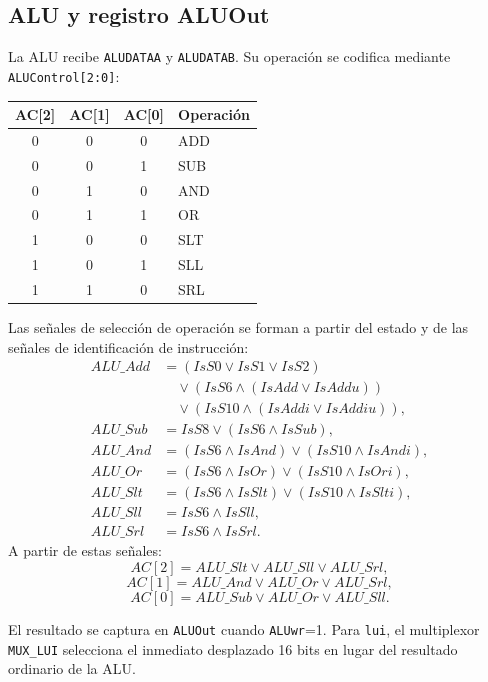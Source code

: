 \documentclass[11pt,a4paper]{article}
\begin{document}
\subsection{ALU y registro ALUOut}

La ALU recibe \texttt{ALUDATAA} y \texttt{ALUDATAB}. Su operación se codifica mediante \texttt{ALUControl[2:0]}:

\begin{center}
\begin{tabular}{ccc l}
\toprule
\textbf{AC[2]} & \textbf{AC[1]} & \textbf{AC[0]} & \textbf{Operación} \\
\midrule
0 & 0 & 0 & ADD \\
0 & 0 & 1 & SUB \\
0 & 1 & 0 & AND \\
0 & 1 & 1 & OR \\
1 & 0 & 0 & SLT \\
1 & 0 & 1 & SLL \\
1 & 1 & 0 & SRL \\
\bottomrule
\end{tabular}
\end{center}

Las señales de selección de operación se forman a partir del estado y de las señales de identificación de instrucción:
\begin{align*}
ALU\_Add &= (IsS0\lor IsS1\lor IsS2)\\
 &\quad\lor(IsS6\land(IsAdd\lor IsAddu))\\
 &\quad\lor(IsS10\land(IsAddi\lor IsAddiu)),\\
ALU\_Sub &= IsS8\lor(IsS6\land IsSub),\\
ALU\_And &= (IsS6\land IsAnd)\lor(IsS10\land IsAndi),\\
ALU\_Or &= (IsS6\land IsOr)\lor(IsS10\land IsOri),\\
ALU\_Slt &= (IsS6\land IsSlt)\lor(IsS10\land IsSlti),\\
ALU\_Sll &= IsS6\land IsSll,\\
ALU\_Srl &= IsS6\land IsSrl.
\end{align*}
A partir de estas señales:
\[
 AC[2]=ALU\_Slt\lor ALU\_Sll\lor ALU\_Srl,
\]
\[
 AC[1]=ALU\_And\lor ALU\_Or\lor ALU\_Srl,
\]
\[
 AC[0]=ALU\_Sub\lor ALU\_Or\lor ALU\_Sll.
\]

El resultado se captura en \texttt{ALUOut} cuando \texttt{ALUwr}=1. Para \texttt{lui}, el multiplexor \texttt{MUX\_LUI} selecciona el inmediato desplazado 16 bits en lugar del resultado ordinario de la ALU.
\end{document}
